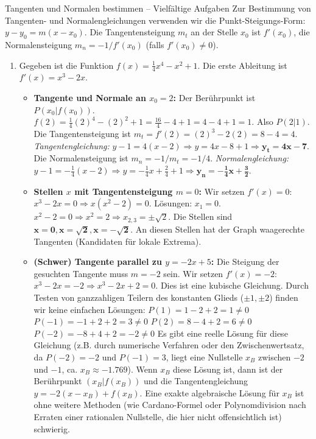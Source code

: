 \begin{loesungsumgebung}{Tangenten und Normalen bestimmen – Vielfältige Aufgaben}
Zur Bestimmung von Tangenten- und Normalengleichungen verwenden wir die Punkt-Steigungs-Form: $y - y_0 = m(x - x_0)$. Die Tangentensteigung $m_t$ an der Stelle $x_0$ ist $f'(x_0)$, die Normalensteigung $m_n = -1/f'(x_0)$ (falls $f'(x_0) \neq 0$).

\begin{enumerate}[label=(\alph*)]
    \item Gegeben ist die Funktion $f(x) = \frac{1}{4}x^4 - x^2 + 1$.
    Die erste Ableitung ist $f'(x) = x^3 - 2x$.
    \begin{itemize}
        \item \textbf{Tangente und Normale an $x_0 = 2$:}
        Der Berührpunkt ist $P(x_0|f(x_0))$.
        $f(2) = \frac{1}{4}(2)^4 - (2)^2 + 1 = \frac{16}{4} - 4 + 1 = 4 - 4 + 1 = 1$. Also $P(2|1)$.
        Die Tangentensteigung ist $m_t = f'(2) = (2)^3 - 2(2) = 8 - 4 = 4$.
        \textit{Tangentengleichung:} $y - 1 = 4(x - 2) \Rightarrow y = 4x - 8 + 1 \Rightarrow \mathbf{y_t = 4x - 7}$.
        Die Normalensteigung ist $m_n = -1/m_t = -1/4$.
        \textit{Normalengleichung:} $y - 1 = -\frac{1}{4}(x - 2) \Rightarrow y = -\frac{1}{4}x + \frac{2}{4} + 1 \Rightarrow \mathbf{y_n = -\frac{1}{4}x + \frac{3}{2}}$.

        \item \textbf{Stellen $x$ mit Tangentensteigung $m=0$:}
        Wir setzen $f'(x) = 0$:
        $x^3 - 2x = 0 \Rightarrow x(x^2 - 2) = 0$.
        Lösungen: $x_1 = 0$.
        $x^2 - 2 = 0 \Rightarrow x^2 = 2 \Rightarrow x_{2,3} = \pm\sqrt{2}$.
        Die Stellen sind $\mathbf{x=0, x=\sqrt{2}, x=-\sqrt{2}}$. An diesen Stellen hat der Graph waagerechte Tangenten (Kandidaten für lokale Extrema).

        \item \textbf{(Schwer) Tangente parallel zu $y = -2x+5$:}
        Die Steigung der gesuchten Tangente muss $m=-2$ sein. Wir setzen $f'(x) = -2$:
        $x^3 - 2x = -2 \Rightarrow x^3 - 2x + 2 = 0$.
        Dies ist eine kubische Gleichung. Durch Testen von ganzzahligen Teilern des konstanten Glieds ($\pm 1, \pm 2$) finden wir keine einfachen Lösungen:
        $P(1) = 1-2+2 = 1 \neq 0$
        $P(-1) = -1+2+2 = 3 \neq 0$
        $P(2) = 8-4+2 = 6 \neq 0$
        $P(-2) = -8+4+2 = -2 \neq 0$
        Es gibt eine reelle Lösung für diese Gleichung (z.B. durch numerische Verfahren oder den Zwischenwertsatz, da $P(-2)=-2$ und $P(-1)=3$, liegt eine Nullstelle $x_B$ zwischen $-2$ und $-1$, ca. $x_B \approx -1.769$).
        Wenn $x_B$ diese Lösung ist, dann ist der Berührpunkt $(x_B | f(x_B))$ und die Tangentengleichung $y = -2(x-x_B) + f(x_B)$. Eine exakte algebraische Lösung für $x_B$ ist ohne weitere Methoden (wie Cardano-Formel oder Polynomdivision nach Erraten einer rationalen Nullstelle, die hier nicht offensichtlich ist) schwierig.
    \end{itemize}


\end{enumerate}
\end{loesungsumgebung}

